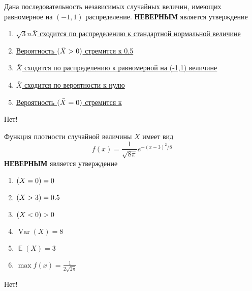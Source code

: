 \documentclass[t]{beamer}
\DeclareMathOperator{\Var}{Var}
\DeclareMathOperator{\E}{\mathbb{E}}
\let\P\relax
\DeclareMathOperator{\P}{\mathbb{P}}
\begin{document}
 \begin{frame} \label{29-No} 
\begin{block}{29} 


Дана последовательность независимых случайных величин, имеющих равномерное на $(-1,1)$ распределение.  \textbf{НЕВЕРНЫМ} является утверждение
 


 \end{block} 
\begin{enumerate} 
\item[] \hyperlink{29-No}{\beamergotobutton{} 	$\sqrt3n\bar X$ сходится по распределению к стандартной нормальной величине}
\item[] \hyperlink{29-No}{\beamergotobutton{} Вероятность	$\P(\bar X>0)$ стремится к 0.5}
\item[] \hyperlink{29-Yes}{\beamergotobutton{}   $\bar X$ сходится по распределению к равномерной на (-1,1) величине }
\item[] \hyperlink{29-No}{\beamergotobutton{} $\bar X$ сходится по вероятности к нулю}
\item[] \hyperlink{29-No}{\beamergotobutton{} Вероятность	$\P(\bar X = 0)$ стремится к}
\end{enumerate} 

 \alert{Нет!} 
\end{frame} 


 \begin{frame} \label{30-No} 
\begin{block}{30} 


Функция плотности случайной величины $X$ имеет вид
\[
f(x)=\frac{1}{\sqrt{8\pi}} e^{-(x-3)^2/8}
\]
 \textbf{НЕВЕРНЫМ} является утверждение
 


 \end{block} 
\begin{enumerate} 
\item[] \hyperlink{30-No}{\beamergotobutton{} $\P(X=0)=0$}
\item[] \hyperlink{30-No}{\beamergotobutton{} $\P(X>3)=0.5$}
\item[] \hyperlink{30-No}{\beamergotobutton{} $\P(X<0)>0$}
\item[] \hyperlink{30-Yes}{\beamergotobutton{} $\Var(X)=8$ }
\item[] \hyperlink{30-No}{\beamergotobutton{} $\E(X)=3$}
\item[] \hyperlink{30-No}{\beamergotobutton{} $\max f(x) = \frac{1}{2\sqrt{2\pi}}$}
\end{enumerate} 

 \alert{Нет!} 
\end{frame} 
\end{document}
